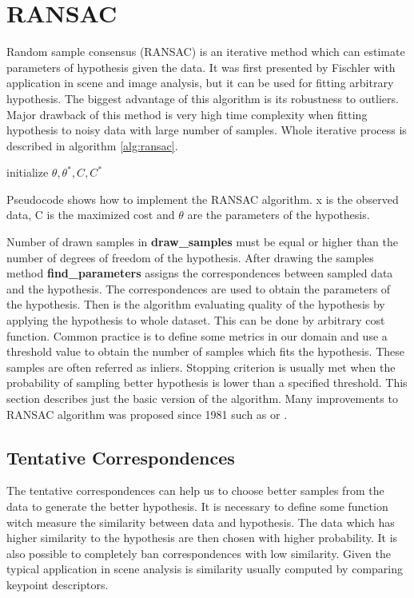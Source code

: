 \section{RANSAC}
Random sample consensus (RANSAC) is an iterative method which can estimate parameters of hypothesis given the data. It was first presented by Fischler \cite{fischler1981} with application in scene and image analysis, but it can be used for fitting arbitrary hypothesis. The biggest advantage of this algorithm is its robustness to outliers. Major drawback of this method is very high time complexity when fitting hypothesis to noisy data with large number of samples. Whole iterative process is described in algorithm \ref{alg:ransac}.
\begin{algorithm}[]
 initialize $\theta, \theta^*, C, C^*$\;
 \caption{Pseudocode shows how to implement the RANSAC algorithm. x is the observed data, C is the maximized cost and $\theta$ are the parameters of the hypothesis.}
 \label{alg:ransac}
\end{algorithm}

Number of drawn samples in \textbf{draw\_samples} must be equal or higher than the number of degrees of freedom of the hypothesis. After drawing the samples method \textbf{find\_parameters} assigns the correspondences between sampled data and the hypothesis. The correspondences are used to obtain the parameters of the hypothesis. Then is the algorithm evaluating quality of the hypothesis by applying the hypothesis to whole dataset. This can be done by arbitrary cost function. Common practice is to define some metrics in our domain and use a threshold value to obtain the number of samples which fits the hypothesis. These samples are often referred as inliers. Stopping criterion is usually met when the probability of sampling better hypothesis is lower than a specified threshold. This section describes just the basic version of the algorithm. Many improvements to RANSAC algorithm was proposed since 1981 such as \cite{chum2003} or \cite{chum2008}.

\subsection{Tentative Correspondences}
The tentative correspondences can help us to choose better samples from the data to generate the better hypothesis. It is necessary to define some function witch measure the similarity between data and  hypothesis. The data which has higher similarity to the hypothesis are then chosen with higher probability. It is also possible to completely ban correspondences with low similarity. Given the typical application in scene analysis is similarity usually computed by comparing keypoint descriptors.


